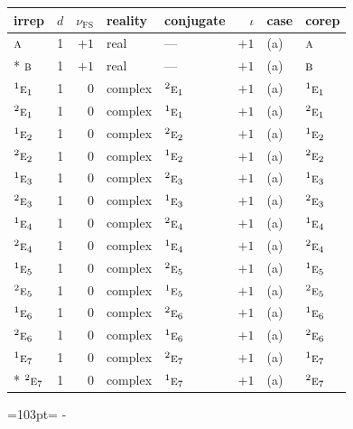 \documentclass[10pt,a4paper]{article}
\newcommand{\needspace}[1]{\par\penalty-100\begingroup\dimen0=#1\relax\dimen2=\pagegoal
  \advance\dimen2-\pagetotal\ifdim\dimen0>\dimen2\relax\ifdim\dimen2>0pt\vfil\break\fi\fi
  \endgroup}
\numberwithin{equation}{section}
\newcommand{\irr}[1]{\text{\normalfont\scshape #1}}
\newcommand{\conjpair}[1]{{}^{#1}}
\newcommand{\fsind}{\nu_{\mathrm{FS}}}
\begin{document}
{\small\renewcommand{\arraystretch}{1.25}\setlength{\tabcolsep}{4pt}\begin{longtable}{@{}lrrllrll@{}}\toprule
irrep & $d$ & $\fsind$ & reality & conjugate & $\iota$ & case & corep\\\midrule\endhead
\bottomrule\endfoot\endlastfoot
$\irr{a}$ & 1 & $+1$ & real & --- & $+1$ & (a) & $\irr{a}$\\*
$\irr{b}$ & 1 & $+1$ & real & --- & $+1$ & (a) & $\irr{b}$\\
$\conjpair{1}\irr{e}_{1}$ & 1 & $0$ & complex & $\conjpair{2}\irr{e}_{1}$ & $+1$ & (a) & $\conjpair{1}\irr{e}_{1}$\\
$\conjpair{2}\irr{e}_{1}$ & 1 & $0$ & complex & $\conjpair{1}\irr{e}_{1}$ & $+1$ & (a) & $\conjpair{2}\irr{e}_{1}$\\
$\conjpair{1}\irr{e}_{2}$ & 1 & $0$ & complex & $\conjpair{2}\irr{e}_{2}$ & $+1$ & (a) & $\conjpair{1}\irr{e}_{2}$\\
$\conjpair{2}\irr{e}_{2}$ & 1 & $0$ & complex & $\conjpair{1}\irr{e}_{2}$ & $+1$ & (a) & $\conjpair{2}\irr{e}_{2}$\\
$\conjpair{1}\irr{e}_{3}$ & 1 & $0$ & complex & $\conjpair{2}\irr{e}_{3}$ & $+1$ & (a) & $\conjpair{1}\irr{e}_{3}$\\
$\conjpair{2}\irr{e}_{3}$ & 1 & $0$ & complex & $\conjpair{1}\irr{e}_{3}$ & $+1$ & (a) & $\conjpair{2}\irr{e}_{3}$\\
$\conjpair{1}\irr{e}_{4}$ & 1 & $0$ & complex & $\conjpair{2}\irr{e}_{4}$ & $+1$ & (a) & $\conjpair{1}\irr{e}_{4}$\\
$\conjpair{2}\irr{e}_{4}$ & 1 & $0$ & complex & $\conjpair{1}\irr{e}_{4}$ & $+1$ & (a) & $\conjpair{2}\irr{e}_{4}$\\
$\conjpair{1}\irr{e}_{5}$ & 1 & $0$ & complex & $\conjpair{2}\irr{e}_{5}$ & $+1$ & (a) & $\conjpair{1}\irr{e}_{5}$\\
$\conjpair{2}\irr{e}_{5}$ & 1 & $0$ & complex & $\conjpair{1}\irr{e}_{5}$ & $+1$ & (a) & $\conjpair{2}\irr{e}_{5}$\\
$\conjpair{1}\irr{e}_{6}$ & 1 & $0$ & complex & $\conjpair{2}\irr{e}_{6}$ & $+1$ & (a) & $\conjpair{1}\irr{e}_{6}$\\
$\conjpair{2}\irr{e}_{6}$ & 1 & $0$ & complex & $\conjpair{1}\irr{e}_{6}$ & $+1$ & (a) & $\conjpair{2}\irr{e}_{6}$\\
$\conjpair{1}\irr{e}_{7}$ & 1 & $0$ & complex & $\conjpair{2}\irr{e}_{7}$ & $+1$ & (a) & $\conjpair{1}\irr{e}_{7}$\\*
$\conjpair{2}\irr{e}_{7}$ & 1 & $0$ & complex & $\conjpair{1}\irr{e}_{7}$ & $+1$ & (a) & $\conjpair{2}\irr{e}_{7}$\\
\bottomrule\end{longtable}}
\needspace{103pt}
\end{document}

